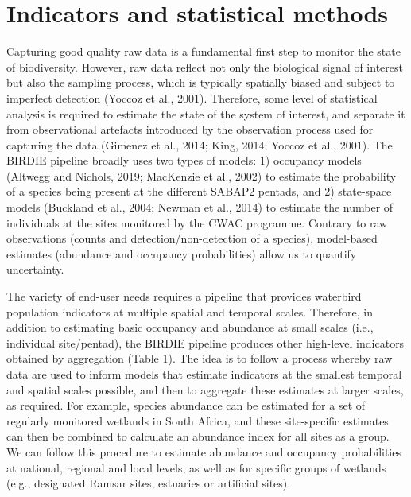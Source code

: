 \documentclass[utf8]{frontiersSCNS}
\begin{document}
\hypertarget{indicators-and-statistical-methods}{%
\section*{Indicators and statistical
methods}\label{indicators-and-statistical-methods}}

Capturing good quality raw data is a fundamental first step to monitor
the state of biodiversity. However, raw data reflect not only the
biological signal of interest but also the sampling process, which is
typically spatially biased and subject to imperfect detection (Yoccoz et
al., 2001). Therefore, some level of statistical analysis is required to
estimate the state of the system of interest, and separate it from
observational artefacts introduced by the observation process used for
capturing the data (Gimenez et al., 2014; King, 2014; Yoccoz et al.,
2001). The BIRDIE pipeline broadly uses two types of models: 1)
occupancy models (Altwegg and Nichols, 2019; MacKenzie et al., 2002) to
estimate the probability of a species being present at the different
SABAP2 pentads, and 2) state-space models (Buckland et al., 2004; Newman
et al., 2014) to estimate the number of individuals at the sites
monitored by the CWAC programme. Contrary to raw observations (counts
and detection/non-detection of a species), model-based estimates
(abundance and occupancy probabilities) allow us to quantify
uncertainty.

The variety of end-user needs requires a pipeline that provides
waterbird population indicators at multiple spatial and temporal scales.
Therefore, in addition to estimating basic occupancy and abundance at
small scales (i.e., individual site/pentad), the BIRDIE pipeline
produces other high-level indicators obtained by aggregation (Table 1).
The idea is to follow a process whereby raw data are used to inform
models that estimate indicators at the smallest temporal and spatial
scales possible, and then to aggregate these estimates at larger scales,
as required. For example, species abundance can be estimated for a set
of regularly monitored wetlands in South Africa, and these site-specific
estimates can then be combined to calculate an abundance index for all
sites as a group. We can follow this procedure to estimate abundance and
occupancy probabilities at national, regional and local levels, as well
as for specific groups of wetlands (e.g., designated Ramsar sites,
estuaries or artificial sites).
\end{document}
